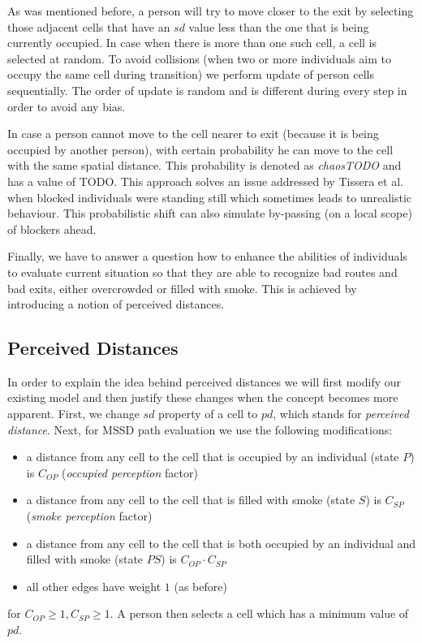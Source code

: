 As was mentioned before, a person will try to move closer to the exit by
selecting those adjacent cells that have an $sd$ value less than the one that
is being currently occupied.
In case when there is more than one such cell, a cell is selected at random.
To avoid collisions (when two or more individuals aim to occupy the same cell
during transition) we perform update of person cells sequentially.
The order of update is random and is different during every step in order to
avoid any bias.

In case a person cannot move to the cell nearer to exit (because it is being 
occupied by another person), with certain probability he can move to the cell
with the same spatial distance.
This probability is denoted as \emph{chaosTODO} and has a value of TODO.
This approach solves an issue addressed by Tissera et al.~\cite{Tissera1} when 
blocked individuals were standing still which sometimes leads to unrealistic 
behaviour.
This probabilistic shift can also simulate by-passing (on a local scope) of
blockers ahead.

Finally, we have to answer a question how to enhance the abilities of
individuals to evaluate current situation so that they are able to recognize bad
routes and bad exits, either overcrowded or filled with smoke.
This is achieved by introducing a notion of perceived distances.

\subsection{Perceived Distances}
In order to explain the idea behind perceived distances we will first modify our 
existing model and then justify these changes when the concept becomes more
apparent. 
First, we change $sd$ property of a cell to $pd$, which stands for
\emph{perceived distance}.
Next, for MSSD path evaluation we use the following modifications:

\begin{itemize}
    \item a distance from any cell to the cell that is occupied by an
    individual (state $P$) is $C_{OP}$ (\emph{occupied perception} factor)
    \item a distance from any cell to the cell that is filled with smoke
    (state $S$) is $C_{SP}$ (\emph{smoke perception} factor)
    \item a distance from any cell to the cell that is both occupied by an
    individual and filled with smoke (state $PS$) is $C_{OP} \cdot C_{SP}$
    \item all other edges have weight $1$ (as before)
\end{itemize}
for $C_{OP} \geq 1, C_{SP} \geq 1$.
A person then selects a cell which has a minimum value of $pd$.

